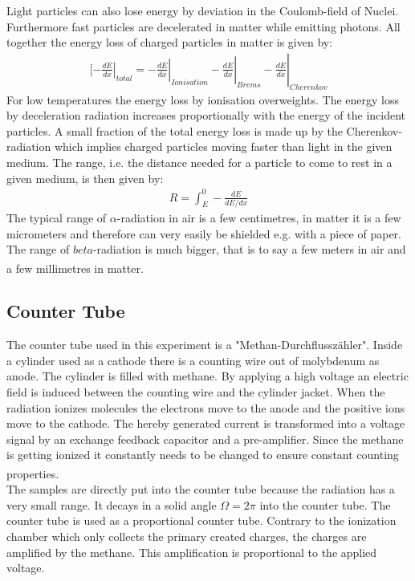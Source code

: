 \documentclass[12pt]{article}
\begin{document}
Light particles can also lose energy by deviation in the Coulomb-field of Nuclei. Furthermore fast particles are decelerated in matter while emitting photons. All together the energy loss of charged particles in matter is given by:
\begin{align}
[\left. \left.\left.\left. -\frac{dE}{dx}\right| _{total}=-\frac{dE}{dx}\right| _{Ionisation}-\frac{dE}{dx}\right|  _{Brems}-\frac{dE}{dx}\right| _{Cherenkov}
\end{align}
For low temperatures the energy loss by ionisation overweights. The energy loss by deceleration radiation increases proportionally with the energy of the incident particles. A small fraction of the total energy loss is made up by the Cherenkov-radiation which implies charged particles moving faster than light in the given medium. The range, i.e. the distance needed for a particle to come to rest in a given medium, is then given by:
\begin{align}
R=\int_{E}^{0}-\frac{dE}{dE/dx}
\end{align}
The typical range of $\alpha$-radiation in air is a few centimetres, in matter it is a few micrometers and therefore can very easily be shielded e.g. with a piece of paper.
The range of $beta$-radiation is much bigger, that is to say a few meters in air and a few millimetres in matter. \textsuperscript{\cite{staat}}

 \subsection{Counter Tube}
 
 The counter tube used in this experiment is a "Methan-Durchflusszähler". Inside a cylinder used as a cathode there is a counting wire out of molybdenum as anode. The cylinder is filled with methane. By applying a high voltage an electric field is induced between the counting wire and the cylinder jacket. When the radiation ionizes molecules the electrons move to the anode and the positive ions move to the cathode. The hereby generated current is transformed into a voltage signal by an exchange feedback capacitor and a pre-amplifier.
 Since the methane is getting ionized it constantly needs to be changed to ensure constant counting properties. \textsuperscript{\cite{staat}} \textsuperscript{\cite{Creutz}}\\
 
 The samples are directly put into the counter tube because the radiation has a very small range. It decays in a solid angle $\Omega=2\pi$ into the counter tube. The counter tube is used as a proportional counter tube. Contrary to the ionization chamber which only collects the primary created charges, the charges are amplified by the methane. This amplification is proportional to the applied voltage.
 
\end{document}

